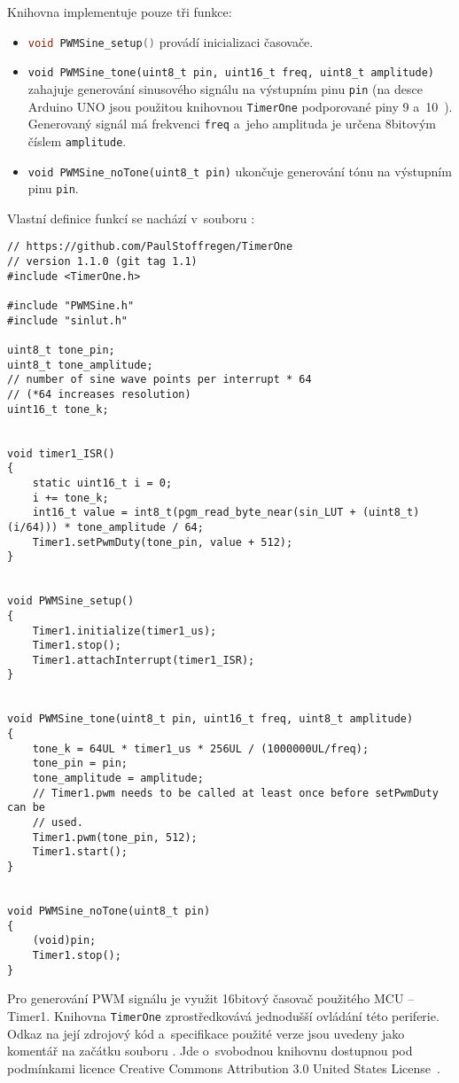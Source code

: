 Knihovna implementuje pouze tři funkce:
\begin{itemize}[nosep]
    \item \lstinline[language=C]!void PWMSine_setup()! provádí inicializaci časovače.

    \item \lstinline[language=myC++]!void PWMSine_tone(uint8_t pin, uint16_t freq, uint8_t amplitude)!
        zahajuje generování sinusového signálu na výstupním pinu \texttt{pin}
        (na desce Arduino UNO jsou použitou knihovnou \texttt{TimerOne}
        podporované piny 9 a~10~\cite{TimerOnedocs}). Generovaný signál má
        frekvenci \texttt{freq} a~jeho amplituda je určena 8bitovým číslem
        \texttt{amplitude}.

    \item \lstinline[language=myC++]!void PWMSine_noTone(uint8_t pin)!
        ukončuje generování tónu na výstupním pinu \texttt{pin}.
\end{itemize}

Vlastní definice funkcí se nachází v~souboru :
\begin{lstlisting}[language=myC++,style=numbers]
// https://github.com/PaulStoffregen/TimerOne
// version 1.1.0 (git tag 1.1)
#include <TimerOne.h>

#include "PWMSine.h"
#include "sinlut.h"

uint8_t tone_pin;
uint8_t tone_amplitude;
// number of sine wave points per interrupt * 64
// (*64 increases resolution)
uint16_t tone_k;


void timer1_ISR()
{
    static uint16_t i = 0;
    i += tone_k;
    int16_t value = int8_t(pgm_read_byte_near(sin_LUT + (uint8_t)(i/64))) * tone_amplitude / 64;
    Timer1.setPwmDuty(tone_pin, value + 512);
}


void PWMSine_setup()
{
    Timer1.initialize(timer1_us);
    Timer1.stop();
    Timer1.attachInterrupt(timer1_ISR);
}


void PWMSine_tone(uint8_t pin, uint16_t freq, uint8_t amplitude)
{
    tone_k = 64UL * timer1_us * 256UL / (1000000UL/freq);
    tone_pin = pin;
    tone_amplitude = amplitude;
    // Timer1.pwm needs to be called at least once before setPwmDuty can be
    // used.
    Timer1.pwm(tone_pin, 512);
    Timer1.start();
}


void PWMSine_noTone(uint8_t pin)
{
    (void)pin;
    Timer1.stop();
}
\end{lstlisting}

Pro generování PWM signálu je využit 16bitový časovač použitého MCU -- Timer1.
Knihovna \texttt{TimerOne} zprostředkovává jednodušší ovládání této periferie.
Odkaz na její zdrojový kód a~specifikace použité verze jsou uvedeny jako
komentář na začátku souboru . Jde o~svobodnou knihovnu
dostupnou pod podmínkami licence
\foreignlanguage{english}{Creative Commons Attribution 3.0 United States
License}~\cite{TimerOnerepo}.

